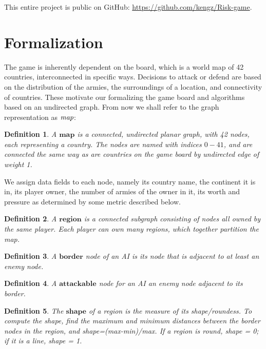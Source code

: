 \documentclass[12pt]{article}  %
\newtheorem{definition}{Definition}
\begin{document}
This entire project is public on GitHub: \url{https://github.com/kengz/Risk-game}.



\section{Formalization} \label{formalization}

The game is inherently dependent on the board, which is a world map of 42 countries, interconnected in specific ways. Decisions to attack or defend are based on the distribution of the armies, the surroundings of a location, and connectivity of countries. These motivate our formalizing the game board and algorithms based on an undirected graph. From now we shall refer to the graph representation as $\emph{map}$:

\begin{definition} \label{map}
A $\textbf{map}$ is a connected, undirected planar graph, with 42 nodes, each representing a country. The nodes are named with indices $0-41$, and are connected the same way as are countries on the game board by undirected edge of weight 1.
\end{definition}

We assign data fields to each node, namely its country name, the continent it is in, its player owner, the number of armies of the owner in it, its worth and pressure as determined by some metric described below.


\begin{definition} \label{region}
A $\textbf{region}$ is a connected subgraph consisting of nodes all owned by the same player. Each player can own many regions, which together partition the map.
\end{definition}

\begin{definition} \label{border}
A $\textbf{border}$ node of an AI is its node that is adjacent to at least an enemy node.
\end{definition}

\begin{definition} \label{attackable}
A $\textbf{attackable}$ node for an AI an enemy node adjacent to its border.
\end{definition}

\begin{definition} \label{shape}
The $\textbf{shape}$ of a region is the measure of its shape/roundess. To compute the shape, find the maximum and minimum distances between the border nodes in the region, and shape=(max-min)/max. If a region is round, shape = 0; if it is a line, shape = 1.
\end{definition}
\end{document}
